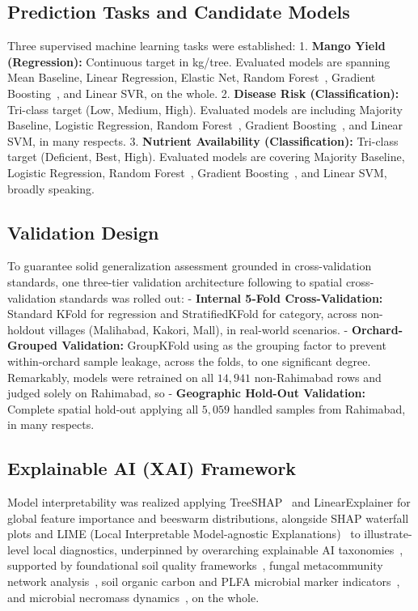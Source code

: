 \documentclass[runningheads,a4paper,oribibl]{llncs}
\begin{document}
\subsection{Prediction Tasks and Candidate Models}
Three supervised machine learning tasks were established\cite{kamilaris2018}:
1. \textbf{Mango Yield (Regression):} Continuous target in kg/tree. Evaluated models are spanning Mean Baseline, Linear Regression, Elastic Net, Random Forest~\cite{breiman2001}, Gradient Boosting~\cite{friedman2001}, and Linear SVR, on the whole.
2. \textbf{Disease Risk (Classification):} Tri-class target (Low, Medium, High). Evaluated models are including Majority Baseline, Logistic Regression, Random Forest~\cite{breiman2001}, Gradient Boosting~\cite{friedman2001}, and Linear SVM, in many respects.
3. \textbf{Nutrient Availability (Classification):} Tri-class target (Deficient, Best, High). Evaluated models are covering Majority Baseline, Logistic Regression, Random Forest~\cite{breiman2001}, Gradient Boosting~\cite{friedman2001}, and Linear SVM, broadly speaking.

\subsection{Validation Design}
To guarantee solid generalization assessment grounded in cross-validation standards\cite{kohavi1995}, one three-tier validation architecture following to spatial cross-validation standards\cite{roberts2017,dormann2007} was rolled out:
- \textbf{Internal 5-Fold Cross-Validation:} Standard KFold for regression and StratifiedKFold for category, across non-holdout villages (Malihabad, Kakori, Mall), in real-world scenarios.
- \textbf{Orchard-Grouped Validation:} GroupKFold using  as the grouping factor to prevent within-orchard sample leakage, across the folds, to one significant degree.
Remarkably, models were retrained on all $14{,}941$ non-Rahimabad rows and judged solely on Rahimabad, so - \textbf{Geographic Hold-Out Validation:} Complete spatial hold-out applying all $5{,}059$ handled samples from Rahimabad, in many respects.

\subsection{Explainable AI (XAI) Framework}
Model interpretability was realized applying TreeSHAP~\cite{lundberg2017} and LinearExplainer for global feature importance and beeswarm distributions, alongside SHAP waterfall plots and LIME (Local Interpretable Model-agnostic Explanations)~\cite{ribeiro2016} to illustrate-level local diagnostics, underpinned by overarching explainable AI taxonomies~\cite{arrieta2020,molnar2019,rudin2019,doshivelez2017}, supported by foundational soil quality frameworks~\cite{bunemann2018,nannipieri2003}, fungal metacommunity network analysis~\cite{toju2018}, soil organic carbon and PLFA microbial marker indicators~\cite{fanin2019,lehmann2015}, and microbial necromass dynamics~\cite{liang2020}, on the whole.
\end{document}
